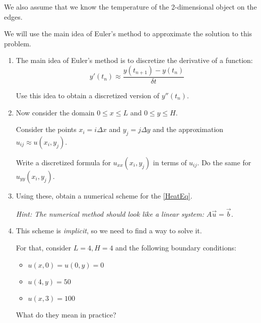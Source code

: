 \documentclass[letter]{article}
\begin{document}
We also assume that we know the temperature of the 2-dimensional object on the edges.

We will use the main idea of Euler's method to approximate the solution to this problem.


\begin{enumerate}[resume, label=\textbf{\arabic*.}]
	\item The main idea of Euler's method is to discretize the derivative of a function:
	\[ y'(t_n) \approx \frac{y(t_{n+1}) - y(t_n)}{\delta t} \]
	
	Use this idea to obtain a discretized version of $y''(t_n)$.
	
	
	\item Now consider the domain $0 \leq x \leq L$ and $0 \leq y \leq H$.
	\begin{center}
	\end{center}

	Consider the points $x_i = i \Delta x$ and $y_j = j \Delta y$ and the approximation $u_{ij} \approx u(x_i ,y_j)$.
	
	Write a discretized formula for $u_{xx}(x_i,y_j)$ in terms of $u_{ij}$. Do the same for $u_{yy}(x_i,y_j)$.
	
	\item Using these, obtain a numerical scheme for the \ref{HeatEq}.
	
	\textit{Hint: The numerical method should look like a linear system: $A \vec{u} = \vec{b}$.} 

	\item This scheme is \textit{implicit}, so we need to find a way to solve it.
	
	For that, consider $L=4, H=4$ and the following boundary conditions:
	\begin{itemize}
		\item $u(x,0) = u(0,y) = 0$
		\item $u(4,y) = 50$
		\item $u(x,3) = 100$
	\end{itemize}
	
	What do they mean in practice?
	

\end{enumerate}
\end{document}
